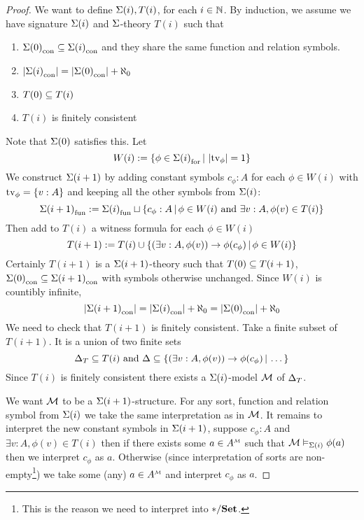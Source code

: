 \begin{proof}
    We want to define $\Sigma(i),T(i)$, 
    for each $i \in \mathbb{N}$.    
    By induction, 
    we assume we have signature $\Sigma(i)$ and 
    $\Sigma$-theory $T(i)$ such that 
    \begin{enumerate}
        \item ${\Sigma(0)}_\mathrm{con} \subseteq {\Sigma(i)}_\mathrm{con}$
        and they share the same function and relation symbols.
        \item $|{\Sigma(i)}_\mathrm{con}| = |{\Sigma(0)}_\mathrm{con}| + \aleph_0$
        \item $T(0) \subseteq T(i)$
        \item $T(i)$ is finitely consistent
    \end{enumerate}
    Note that $\Sigma(0)$ satisfies this.
    Let 
    \[
        W(i) := \left\{\phi \in {\Sigma(i)}_\mathrm{for} 
        \,|\, \left\vert \textrm{tv}_{\phi} \right\vert = 1\right\}
    \]
    We construct $\Sigma(i+1)$ 
    by adding constant symbols $c_\phi : A$ for each $\phi \in W(i)$ 
    with $\textrm{tv}_{\phi} = \left\{v : A\right\}$ and 
    keeping all the other symbols from $\Sigma(i)$:
    \[
        {\Sigma(i+1)}_\mathrm{fun} :=
        {\Sigma(i)}_\mathrm{fun} \sqcup \left\{c_\phi : A
        \,|\, \phi \in W(i) \text{ and } \exists v : A, \phi(v) \in T(i)\right\}
    \]
    Then add to $T(i)$ a witness formula 
    for each $\phi \in W(i)$
    \[
        T(i+1) := T(i) \cup \left\{(\exists v : A, \phi(v)) \to \phi(c_\phi) \,|\, 
        \phi \in W(i)\right\}
    \]
    Certainly
    $T(i+1)$ is a $\Sigma(i+1)$-theory such that $T(0) \subseteq T(i+1)$,
    ${\Sigma(0)}_\mathrm{con} \subseteq {\Sigma(i+1)}_\mathrm{con}$ with symbols otherwise unchanged.
    Since $W(i)$ is countibly infinite, 
    \[
        |{\Sigma(i+1)}_\mathrm{con}| = |{\Sigma(i)}_\mathrm{con}| + \aleph_0 = 
        |{\Sigma(0)}_\mathrm{con}| + \aleph_0
    \]
    We need to check that $T(i+1)$ is finitely consistent.
    Take a finite subset of $T(i+1)$.
    It is a union of two finite sets 
    \[
        \Delta_T \subseteq T(i) \text{ and }
        \Delta \subseteq \left\{(\exists v : A, \phi(v)) \to \phi(c_\phi) \,|\, \dots\right\}
    \]
    Since $T(i)$ is finitely consistent there exists a $\Sigma(i)$-model
    $\mathcal{M}$ of $\Delta_T$.

    We want $\mathcal{M}$ to be a $\Sigma(i+1)$-structure.
    For any sort, function and relation symbol from $\Sigma(i)$ 
    we take the same interpretation as in $\mathcal{M}$.
    It remains to interpret the new constant symbols in $\Sigma(i+1)$, suppose 
    $c_\phi : A$ and $\exists v : A, \phi(v) \in T(i)$ then
    if there exists some $a \in \modintp{\MM}{A}$ such that 
    $\mathcal{M} \vDash_{\Sigma(i)} \phi(a)$ then we interpret $c_\phi$ as $a$.
    Otherwise (since interpretation of sorts are non-empty\footnote{
        This is the reason we need to interpret into $* / \mathbf{Set}$.
    }) we take some (any) $a \in \mmintp{A}$ and interpret $c_\phi$ as $a$.    


\end{proof}
